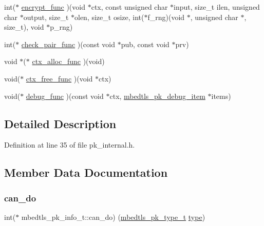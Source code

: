 \begin{DoxyCompactItemize}
\item 
int($\ast$ \mbox{\hyperlink{structmbedtls__pk__info__t_ae6aa9a5ebdd68db1fa364d786d9a1118}{encrypt\+\_\+func}} )(void $\ast$ctx, const unsigned char $\ast$input, size\+\_\+t ilen, unsigned char $\ast$output, size\+\_\+t $\ast$olen, size\+\_\+t osize, int($\ast$f\+\_\+rng)(void $\ast$, unsigned char $\ast$, size\+\_\+t), void $\ast$p\+\_\+rng)
\item 
int($\ast$ \mbox{\hyperlink{structmbedtls__pk__info__t_ad370e83d7f46d53d963b2d88593f2589}{check\+\_\+pair\+\_\+func}} )(const void $\ast$pub, const void $\ast$prv)
\item 
void $\ast$($\ast$ \mbox{\hyperlink{structmbedtls__pk__info__t_af188821fd46e2d130bd0b36f7ad201ec}{ctx\+\_\+alloc\+\_\+func}} )(void)
\item 
void($\ast$ \mbox{\hyperlink{structmbedtls__pk__info__t_a4741fa700325cbdb932e43a1ce04067e}{ctx\+\_\+free\+\_\+func}} )(void $\ast$ctx)
\item 
void($\ast$ \mbox{\hyperlink{structmbedtls__pk__info__t_a61420d1702a434ff7084147cdc86bed3}{debug\+\_\+func}} )(const void $\ast$ctx, \mbox{\hyperlink{structmbedtls__pk__debug__item}{mbedtls\+\_\+pk\+\_\+debug\+\_\+item}} $\ast$items)
\end{DoxyCompactItemize}


\subsection{Detailed Description}


Definition at line 35 of file pk\+\_\+internal.\+h.



\subsection{Member Data Documentation}
\mbox{\label{structmbedtls__pk__info__t_af64d12bcc605260ebfbd24a8c6258e1f}} 
\subsubsection{\texorpdfstring{can\+\_\+do}{can\_do}}
{\footnotesize\ttfamily int($\ast$ mbedtls\+\_\+pk\+\_\+info\+\_\+t\+::can\+\_\+do) (\mbox{\hyperlink{pk_8h_a3fe41eff5605ae727eb9d28dad297020}{mbedtls\+\_\+pk\+\_\+type\+\_\+t}} \mbox{\hyperlink{structmbedtls__pk__info__t_a1290aa516e4b5889952f56edf331c313}{type}})}

